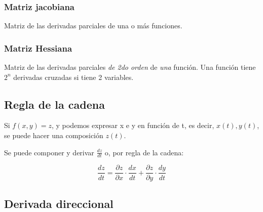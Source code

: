 \subsubsection{Matriz jacobiana}

Matriz de las derivadas parciales de una o más funciones.

\subsubsection{Matriz Hessiana}

Matriz de las derivadas parciales \textit{de 2do orden} 
de \textit{una} función.
Una función tiene \(2^{n}\) derivadas cruzadas si tiene 2 variables.

\subsection{Regla de la cadena}

Si \(f(x,y) = z\),
y podemos expresar x e y en función de t, 
es decir, \(x(t), y(t)\),
se puede hacer una composición \(z(t)\).

Se puede componer y derivar \(\frac{dz}{dt}\) o, por regla de la cadena:

\begin{equation*}
    \frac{dz}{dt} = \frac{\partial z}{\partial x}\cdot\frac{dx}{dt} + \frac{\partial z}{\partial y}\cdot\frac{dy}{dt}
\end{equation*}

\subsection{Derivada direccional}

